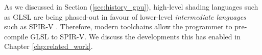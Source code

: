 \documentclass[a4paper,12pt,twoside,openright]{report}
\begin{document}

As we discussed in Section (\ref{sec:history_gpu}), high-level shading
languages such as GLSL are being phased-out in favour of lower-level
\textit{intermediate languages} such as SPIR-V \cite{SPIRV}. Therefore, modern
toolchains allow the programmer to pre-compile GLSL to SPIR-V. We discuss the
developments this has enabled in Chapter \ref{chp:related_work}.



\end{document}
